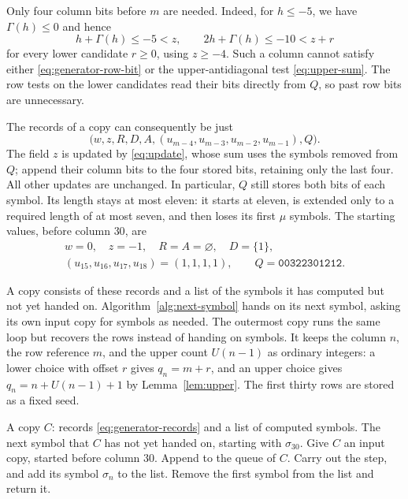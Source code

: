 Only four column bits before $m$ are needed. Indeed, for
$h\le-5$, we have $\Gamma(h)\le0$ and hence
\[
 h+\Gamma(h)\le-5<z,\qquad
 2h+\Gamma(h)\le-10<z+r
\]
for every lower candidate $r\ge0$, using $z\ge-4$. Such a column
cannot satisfy either \eqref{eq:generator-row-bit} or the
upper-antidiagonal test \eqref{eq:upper-sum}. The row tests on the
lower candidates read their bits directly from $Q$, so past row bits
are unnecessary.

The records of a copy can consequently be just
\begin{equation}\label{eq:generator-records}
 \bigl(w,z,R,D,A,(u_{m-4},u_{m-3},u_{m-2},u_{m-1}),Q\bigr).
\end{equation}
The field $z$ is updated by \eqref{eq:update}, whose sum uses the
symbols removed from $Q$; append their column bits to the four
stored bits, retaining only the last four. All other updates are
unchanged. In particular, $Q$ still stores both bits of each symbol.
Its length stays at most eleven: it starts at eleven, is extended
only to a required length of at most seven, and then loses its first
$\mu$ symbols. The starting values, before column $30$, are
\[
 \begin{gathered}
 w=0,\quad z=-1,\quad R=A=\varnothing,\quad D=\{1\},\\
 (u_{15},u_{16},u_{17},u_{18})=(1,1,1,1),\qquad
 Q=\mathtt{00322301212}.
 \end{gathered}
\]

A copy consists of these records and a list of the symbols it has
computed but not yet handed on. Algorithm~\ref{alg:next-symbol}
hands on its next symbol, asking its own input copy for symbols as
needed. The outermost copy runs the same loop but recovers the rows
instead of handing on symbols. It keeps the column $n$, the row
reference $m$, and the upper count $U(n-1)$ as ordinary integers: a
lower choice with offset $r$ gives $q_n=m+r$, and an upper choice
gives $q_n=n+U(n-1)+1$ by Lemma~\ref{lem:upper}. The first thirty
rows are stored as a fixed seed.

\begin{algorithm}[!ht]
\caption{Handing on the next symbol of the queen word}
\label{alg:next-symbol}
\renewcommand{\algorithmicrequire}{\textbf{Input:}}
\renewcommand{\algorithmicensure}{\textbf{Output:}}
\begin{algorithmic}[1]
\Require A copy $C$: records \eqref{eq:generator-records} and a list of computed symbols.
\Ensure The next symbol that $C$ has not yet handed on, starting with $\sigma_{30}$.
        \State Give $C$ an input copy, started before column $30$.
      \EndIf
      \State Append  to the queue of $C$.
    \Else
      \State Carry out the step, and add its symbol $\sigma_n$ to the list.
    \EndIf
  \EndWhile
  \State Remove the first symbol from the list and return it.
\EndFunction
\end{algorithmic}
\end{algorithm}

